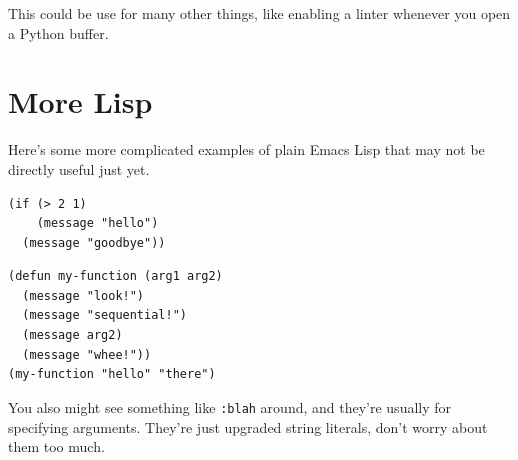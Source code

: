 \documentclass[letterpaper]{article}
\begin{document}
This could be use for many other things, like enabling a linter whenever you open a Python buffer.

\section{More Lisp}
\label{sec:org8698e42}

Here's some more complicated examples of plain Emacs Lisp that may not be directly useful just yet.
\begin{verbatim}
(if (> 2 1)
    (message "hello")
  (message "goodbye"))  
\end{verbatim}

\begin{verbatim}
(defun my-function (arg1 arg2)
  (message "look!")
  (message "sequential!")
  (message arg2)
  (message "whee!"))
(my-function "hello" "there")
\end{verbatim}

You also might see something like \texttt{:blah} around, and they're usually for specifying arguments. They're just upgraded string literals, don't worry about them too much.
\end{document}
